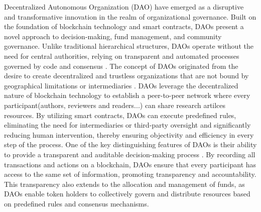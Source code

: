 \documentclass[lettersize,journal]{IEEEtran}
\begin{document}
Decentralized Autonomous Organization (DAO) have emerged as a disruptive and transformative innovation in the realm of organizational governance. Built on the foundation of blockchain technology and smart contracts, DAOs present a novel approach to decision-making, fund management, and community governance. Unlike traditional hierarchical structures, DAOs operate without the need for central authorities, relying on transparent and automated processes governed by code and consensus \cite{buterin2014next}.
The concept of DAOs originated from the desire to create decentralized and trustless organizations that are not bound by geographical limitations or intermediaries \cite{wang2019decentralized}. DAOs leverage the decentralized nature of blockchain technology to establish a peer-to-peer network where  every participant(authors, reviewers and readers...) can share research artilces resources. By utilizing smart contracts, DAOs can execute predefined rules, eliminating the need for intermediaries or third-party oversight and significantly reducing human intervention, thereby ensuring objectivity and efficiency in every step of the process.
One of the key distinguishing features of DAOs is their ability to provide a transparent and auditable decision-making process \cite{kaal2021decentralized}. By recording all transactions and actions on a blockchain, DAOs ensure that every participant has access to the same set of information, promoting transparency and accountability. This transparency also extends to the allocation and management of funds, as DAOs enable token holders to collectively govern and distribute resources based on predefined rules and consensus mechanisms.
\end{document}
